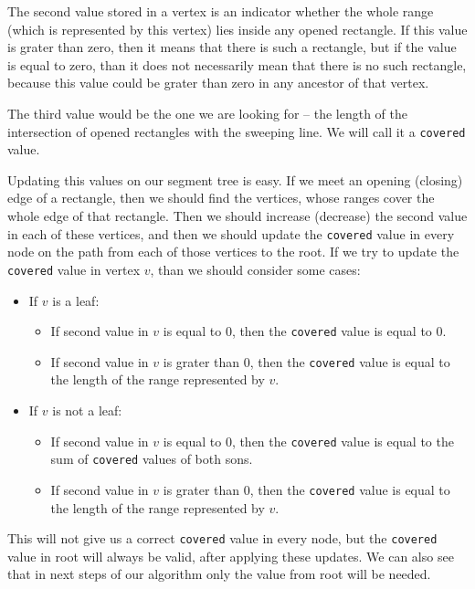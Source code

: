 The second value stored in a vertex is an indicator whether the whole range
	(which is represented by this vertex) lies inside any opened rectangle.
If this value is grater than zero, then it means that there is such a rectangle,
	but if the value is equal to zero, than it does not necessarily mean that there is no such rectangle,
	because this value could be grater than zero in any ancestor of that vertex.

The third value would be the one we are looking for
	-- the length of the intersection of opened rectangles with the sweeping line.
We will call it a \texttt{covered} value.

Updating this values on our segment tree is easy.
If we meet an opening (closing) edge of a rectangle, then we should find the vertices,
	whose ranges cover the whole edge of that rectangle.
Then we should increase (decrease) the second value in each of these vertices,
	and then we should update the \texttt{covered} value in every node on the path
	from each of those vertices to the root.
If we try to update the \texttt{covered} value in vertex $v$, than we should consider some cases:
\begin{itemize}
	\item If $v$ is a leaf:
		\begin{itemize}
			\item If second value in $v$ is equal to $0$, then the \texttt{covered} value is equal to $0$.
			\item If second value in $v$ is grater than $0$, then the \texttt{covered} value
				is equal to the length of the range represented by $v$.
		\end{itemize}
	\item If $v$ is not a leaf:
		\begin{itemize}
			\item If second value in $v$ is equal to $0$, then the \texttt{covered} value
				is equal to the sum of \texttt{covered} values of both sons.
			\item If second value in $v$ is grater than $0$, then the \texttt{covered} value
				is equal to the length of the range represented by $v$.
		\end{itemize}
\end{itemize}
This will not give us a correct \texttt{covered} value in every node,
	but the \texttt{covered} value in root will always be valid, after applying these updates.
We can also see that in next steps of our algorithm only the value from root will be needed.

